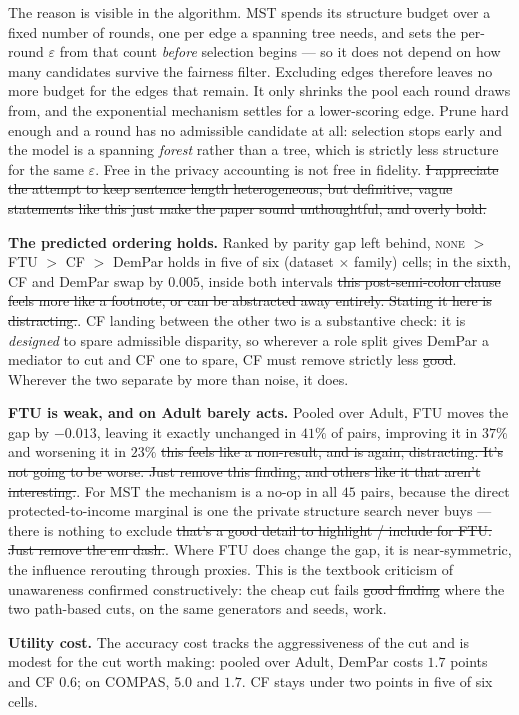 \documentclass{article}
\begin{document}
{{The reason is visible in the algorithm. MST spends its structure budget over a
fixed number of rounds, one per edge a spanning tree needs, and sets the per-round
$\varepsilon$ from that count \emph{before} selection begins --- so it does not
depend on how many candidates survive the fairness filter. Excluding edges
therefore leaves no more budget for the edges that remain. It only shrinks the pool
each round draws from, and the exponential mechanism settles for a lower-scoring
edge. Prune hard enough and a round has no admissible candidate at all: selection
stops early and the model is a spanning \emph{forest} rather than a tree, which is
strictly less structure for the same $\varepsilon$. Free in the privacy accounting
is not free in fidelity. \st{I appreciate the attempt to keep sentence length heterogeneous, but definitive, vague statements like this just make the paper sound unthoughtful, and overly bold.}

\textbf{The predicted ordering holds.} Ranked by parity gap left behind,
\textsc{none} $>$ FTU $>$ CF $>$ DemPar holds in five of six (dataset $\times$
family) cells; in the sixth, CF and DemPar swap by $0.005$, inside both intervals \st{this post-semi-colon clause feels more like a footnote, or can be abstracted away entirely. Stating it here is distracting.}.
CF landing between the other two is a substantive check: it is \emph{designed} to
spare admissible disparity, so wherever a role split gives DemPar a mediator to cut
and CF one to spare, CF must remove strictly less \st{good}. Wherever the two separate by
more than noise, it does.

\textbf{FTU is weak, and on Adult barely acts.} Pooled over Adult, FTU moves the
gap by $-0.013$, leaving it exactly unchanged in $41\%$ of pairs, improving it in
$37\%$ and worsening it in $23\%$ \st{this feels like a non-result, and is again, distracting. It's not going to be worse. Just remove this finding, and others like it that aren't interesting.}. For MST the mechanism is a no-op in all $45$
pairs, because the direct protected-to-income marginal is one the private structure
search never buys --- there is nothing to exclude \st{that's a good detail to highlight / include for FTU. Just remove the em dash.}. Where FTU does change the gap, it
is near-symmetric, the influence rerouting through proxies. This is the textbook
criticism of unawareness confirmed constructively: the cheap cut fails \st{good finding} where the two
path-based cuts, on the same generators and seeds, work.

\textbf{Utility cost.} The accuracy cost tracks the aggressiveness of the cut and
is modest for the cut worth making: pooled over Adult, DemPar costs $1.7$ points
and CF $0.6$; on COMPAS, $5.0$ and $1.7$. CF stays under two points in five of six
cells.

}}
\end{document}
